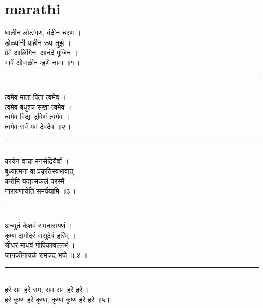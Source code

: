 \documentclass[letterpaper,twocolumn,openany,nodeprecatedcode]{dndbook}
\begin{document}
  \section*{marathi}
  घालीन लोटांगण, वंदीन चरण । \\
  डोळ्यांनी पाहीन रूप तुझे । \\
  प्रेमे आलिंगिन, आनंदे पूजिन । \\
  भावें ओवाळीन म्हणे नामा ॥१॥ \\
  \rule{\linewidth}{1pt} \\
  त्वमेव माता पिता त्वमेव । \\
  त्वमेव बंधुश्च सखा त्वमेव । \\
  त्वमेव विद्या द्रविणं त्वमेव । \\
  त्वमेव सर्वं मम देवदेव ॥२॥ \\
  \rule{\linewidth}{1pt} \\
  कायेन वाचा मनसेंद्रियैर्वा । \\
  बुध्यात्मना वा प्रकृतिस्वभावात् । \\
  करोमि यद्यत्सकलं परस्मै । \\
  नारायणायेति समर्पयामि ॥३॥ \\
  \rule{\linewidth}{1pt} \\
  अच्युतं केशवं रामनारायणं । \\
  कृष्ण दामोदरं वासुदेवं हरिम् । \\
  श्रीधरं माधवं गोपिकावल्लभं । \\
  जानकीनायकं रामचंद्र भजे ॥ ४ ॥ \\
  \rule{\linewidth}{1pt} \\
  हरे राम हरे राम, राम राम हरे हरे । \\
  हरे कृष्ण हरे कृष्ण, कृष्ण कृष्ण हरे हरे ॥५॥ \\
  \pagebreak
\end{document}

